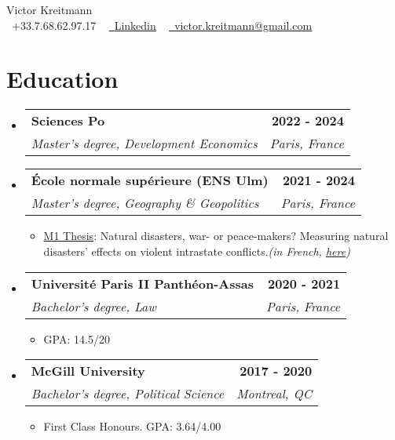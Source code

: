 \documentclass[a4paper,11pt]{article}
\makeatletter
\newcommand{\resumeItem}[1]{
  \item\small{
    {#1 \vspace{-2pt}}
  }
}
\newcommand{\resumeSubheading}[4]{
  \vspace{-2pt}\item
    \begin{tabular*}{1.00\textwidth}[t]{l@{\extracolsep{\fill}}r}
      \textbf{{\small #1}} & {{\textbf{\small #2}}} \\
      \textit{\small#3} & \textit{\small #4} \\
    \end{tabular*}\vspace{-7pt}
}
\newcommand{\resumeSubHeadingListStart}{\begin{itemize}[leftmargin=0.0in, label={}]}
\newcommand{\resumeSubHeadingListEnd}{\end{itemize}}
\newcommand{\resumeItemListStart}{\begin{itemize}}
\newcommand{\resumeItemListEnd}{\end{itemize}\vspace{-5pt}}
\makeatother
\begin{document}

\begin{center}
    {\Huge \upshape Victor Kreitmann} \\ \vspace{1pt}
    \small \raisebox{-0.1\height}\faPhone\ +33.7.68.62.97.17 ~
    \href{https://www.linkedin.com/in/victor-kreitmann/}{\raisebox{-0.2\height}\faLinkedin\ \underline{Linkedin}}  ~    
    \href{mailto:victor.kreitmann@gmail.com}{\raisebox{-0.2\height}\faEnvelope\  \underline{victor.kreitmann@gmail.com}} ~ 
    \vspace{0pt}
\end{center}




\section{Education}
  \resumeSubHeadingListStart
    \resumeSubheading
      {Sciences Po}{2022 - 2024}
      {Master's degree, Development Economics}{Paris, France}
      
      \resumeSubheading
      {École normale supérieure (ENS Ulm)}{2021 - 2024}
      {Master's degree, Geography \& Geopolitics}{Paris, France}
      \resumeItemListStart
      \resumeItem{\underline{M1 Thesis}: Natural disasters, war- or peace-makers? Measuring natural disasters' effects on violent intrastate conflicts.\emph{(in French, \href{https://drive.google.com/file/d/1O6ke_2wZjExpSnBBnSKN7shPb0E3ZBgg/view?usp=sharing}{\underline{here}})}}
      \resumeItemListEnd
      
      \resumeSubheading
      {Université Paris II Panthéon-Assas}{2020 - 2021}
      {Bachelor's degree, Law}{Paris, France}
      \resumeItemListStart
      \resumeItem{GPA: 14.5/20}
      \resumeItemListEnd
      
      \resumeSubheading
      {McGill University}{2017 - 2020}
      {Bachelor's degree, Political Science}{Montreal, QC}
      \resumeItemListStart
      \resumeItem{First Class Honours. GPA: 3.64/4.00}
      \resumeItemListEnd
  \resumeSubHeadingListEnd
\vspace{-10pt}
\end{document}
